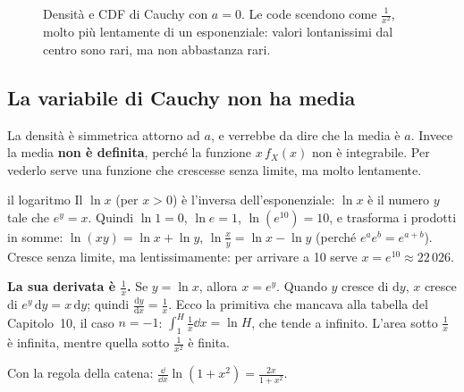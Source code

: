 \begin{figure}[H]
\centering
{}
\caption{Densità e CDF di Cauchy con $a = 0$. Le code scendono come $\frac{1}{x^2}$, molto più lentamente di un
esponenziale: valori lontanissimi dal centro sono rari, ma non abbastanza rari.}
\end{figure}

\subsection{La variabile di Cauchy non ha media}

La densità è simmetrica attorno ad $a$, e verrebbe da dire che la media è $a$. Invece la media \textbf{non è definita},
perché la funzione $x\, f_X(x)$ non è integrabile. Per vederlo serve una funzione che crescesse senza limite, ma molto
lentamente.

\begin{richiamo}{il logaritmo}
Il  $\ln x$ (per $x > 0$) è l'inversa dell'esponenziale: $\ln x$ è il numero $y$ tale che
$e^y = x$. Quindi $\ln 1 = 0$, $\ln e = 1$, $\ln(e^{10}) = 10$, e trasforma i prodotti in somme:
$\ln(xy) = \ln x + \ln y$, $\ln\frac{x}{y} = \ln x - \ln y$ (perché $e^{a} e^{b} = e^{a + b}$). Cresce senza limite, ma
lentissimamente: per arrivare a 10 serve $x = e^{10} \approx 22\,026$.

\textbf{La sua derivata è $\frac1x$.} Se $y = \ln x$, allora $x = e^y$. Quando $y$ cresce di $\mathrm{d}y$, $x$ cresce di
$e^y\, \mathrm{d}y = x\, \mathrm{d}y$; quindi $\frac{\mathrm{d}y}{\mathrm{d}x} = \frac1x$. Ecco la primitiva che mancava
alla tabella del Capitolo~10, il caso $n = -1$: $\int_1^H \frac{1}{x} \dd x = \ln H$, che tende a infinito. L'area sotto
$\frac{1}{x}$ è infinita, mentre quella sotto $\frac{1}{x^2}$ è finita.

Con la regola della catena: $\frac{\dd}{\dd x} \ln(1 + x^2) = \frac{2x}{1 + x^2}$.
\end{richiamo}


